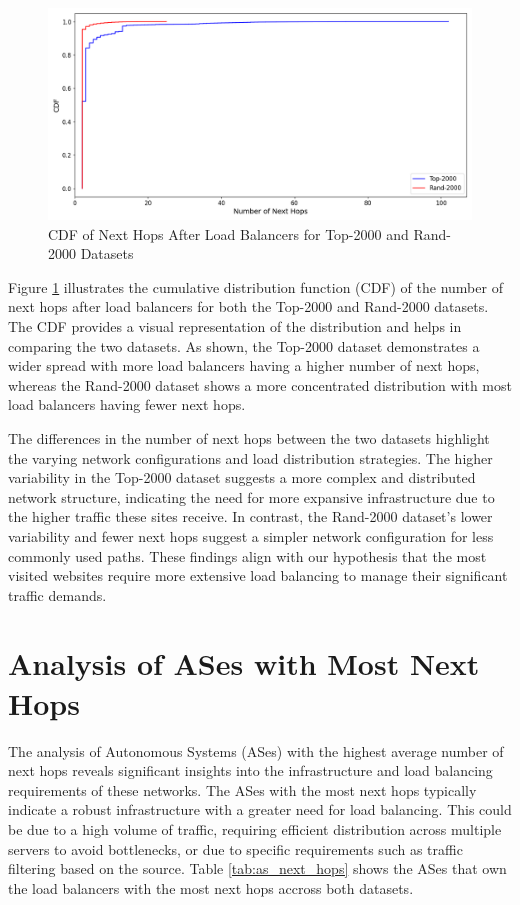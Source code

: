 \documentclass[12pt]{cwru_thesis}
\begin{document}
\begin{figure}[h]
    \centering
    \includegraphics[width=\linewidth]{figures/cdf_next_hops.png}
    \caption{CDF of Next Hops After Load Balancers for Top-2000 and Rand-2000 Datasets}
    \label{fig:cdf_next_hops}
\end{figure}

Figure \ref{fig:cdf_next_hops} illustrates the cumulative distribution function (CDF) of the number of next hops after load balancers for both the Top-2000 and Rand-2000 datasets. The CDF provides a visual representation of the distribution and helps in comparing the two datasets. As shown, the Top-2000 dataset demonstrates a wider spread with more load balancers having a higher number of next hops, whereas the Rand-2000 dataset shows a more concentrated distribution with most load balancers having fewer next hops.



The differences in the number of next hops between the two datasets highlight the varying network configurations and load distribution strategies. The higher variability in the Top-2000 dataset suggests a more complex and distributed network structure, indicating the need for more expansive infrastructure due to the higher traffic these sites receive. In contrast, the Rand-2000 dataset's lower variability and fewer next hops suggest a simpler network configuration for less commonly used paths. These findings align with our hypothesis that the most visited websites require more extensive load balancing to manage their significant traffic demands.

\section{Analysis of ASes with Most Next Hops}

The analysis of Autonomous Systems (ASes) with the highest average number of next hops reveals significant insights into the infrastructure and load balancing requirements of these networks. 
The ASes with the most next hops typically indicate a robust infrastructure with a greater need for load balancing. This could be due to a high volume of traffic, requiring efficient distribution across multiple servers to avoid bottlenecks, or due to specific requirements such as traffic filtering based on the source. Table \ref{tab:as_next_hops} shows the ASes that own the load balancers with the most next hops accross both datasets.\\
\end{document}
